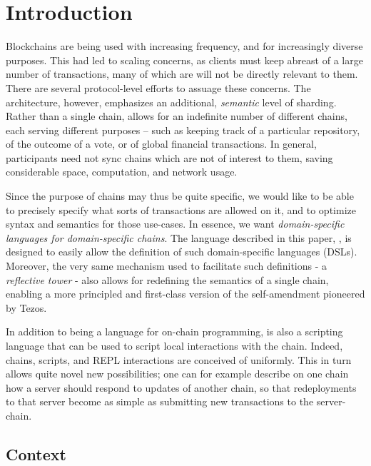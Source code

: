 \section{Introduction}
\label{s:introduction}

Blockchains are being used with increasing frequency, and for increasingly
diverse purposes. This had led to scaling concerns, as clients must keep
abreast of a large number of transactions, many of which are will not be
directly relevant to them. There are several protocol-level efforts to assuage
these concerns. The \oscoin{} architecture, however, emphasizes an additional,
\textit{semantic} level of sharding. Rather than a single chain, \oscoin{}
allows for an indefinite number of different chains, each serving different
purposes -- such as keeping track of a particular repository, of the outcome of
a vote, or of global financial transactions. In general, participants need not
sync chains which are not of interest to them, saving considerable space,
computation, and network usage.

Since the purpose of chains may thus be quite specific, we would like to be
able to precisely specify what sorts of transactions are allowed on it, and to
optimize syntax and semantics for those use-cases. In essence, we want
\textit{domain-specific languages for domain-specific chains}. The language
described in this paper, \rad, is designed to easily allow the definition of
such domain-specific languages (DSLs). Moreover, the very same mechanism used to
facilitate such definitions - a \textit{reflective tower} - also
allows for redefining the semantics of a single chain, enabling a more
principled and first-class version of the self-amendment pioneered by
Tezos.\cite{Goodman2014}

In addition to being a language for on-chain programming, \rad is also a
scripting language that can be used to script local interactions with the
chain. Indeed, chains, scripts, and REPL interactions are conceived of
uniformly. This in turn allows quite novel new possibilities; one can for
example describe on one chain how a server should respond to updates of another
chain, so that redeployments to that server become as simple as submitting new
transactions to the server-chain.

\subsection{Context}

